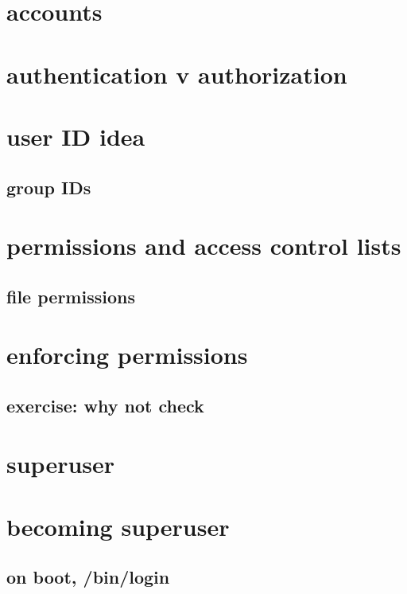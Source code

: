\section{accounts}


\section{authentication v authorization}


\section{user ID idea}


\subsection{group IDs}


\section{permissions and access control lists}
\subsection{file permissions}


\section{enforcing permissions}


\subsection{exercise: why not check}


\section{superuser}


\section{becoming superuser}

\subsection{on boot, /bin/login}


